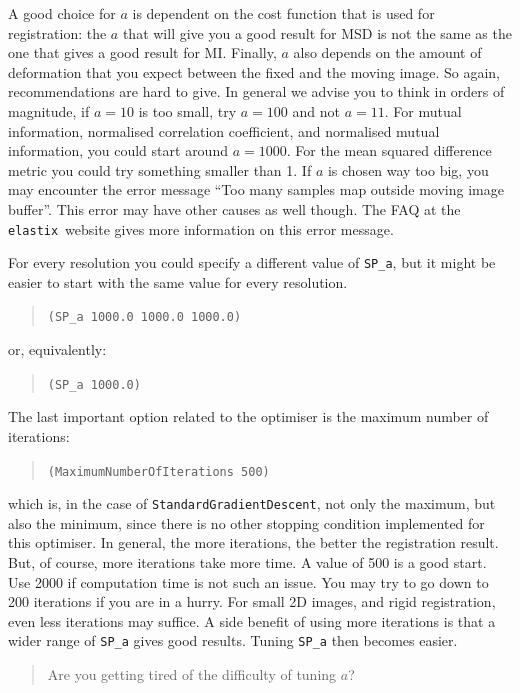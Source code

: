 \documentclass[]{report}
\newcommand{\elastix}{\texttt{elastix}}
\begin{document}
A good choice for $a$ is dependent on the cost function that is used
for registration: the $a$ that will give you a good result for MSD
is not the same as the one that gives a good result for MI. Finally,
$a$ also depends on the amount of deformation that you expect
between the fixed and the moving image. So again, recommendations
are hard to give. In general we advise you to think in orders of
magnitude, if $a = 10$ is too small, try $a = 100$ and not $a = 11$.
For mutual information, normalised correlation coefficient, and
normalised mutual information, you could start around $a = 1000$.
For the mean squared difference metric you could try something
smaller than 1. If $a$ is chosen way too big, you may encounter the
error message ``Too many samples map outside moving image buffer''.
This error may have other causes as well though. The FAQ at the
\elastix\ website gives more information on this error message.

For every resolution you could specify a different value of
\texttt{SP\_a}, but it might be easier to start with the same
value for every resolution.
\begin{quote}
\texttt{(SP\_a 1000.0 1000.0 1000.0)}
\end{quote}
or, equivalently:
\begin{quote}
\texttt{(SP\_a 1000.0)}
\end{quote}

The last important option related to the optimiser is the maximum
number of iterations:
\begin{quote}
\texttt{(MaximumNumberOfIterations 500)}
\end{quote}
which is, in the case of \texttt{StandardGradientDescent}, not only
the maximum, but also the minimum, since there is no other stopping
condition implemented for this optimiser. In general, the more
iterations, the better the registration result. But, of course, more
iterations take more time. A value of 500 is a good start. Use 2000
if computation time is not such an issue. You may try to go down to
200 iterations if you are in a hurry. For small 2D images, and rigid
registration, even less iterations may suffice. A side benefit of
using more iterations is that a wider range of \texttt{SP\_a} gives
good results. Tuning \texttt{SP\_a} then becomes easier.

\begin{quote}
Are you getting tired of the difficulty of tuning $a$?
\end{quote}
\end{document}
